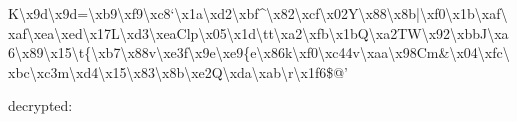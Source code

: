 \documentclass[11pt]{article}
\begin{document}
K\textbackslash{}x9d\textbackslash{}x9d=\textbackslash{}xb9\textbackslash{}xf9\textbackslash{}xc8`\textbackslash{}x1a\textbackslash{}xd2\textbackslash{}xbf\^{}\textbackslash{}x82\textbackslash{}xcf\textbackslash{}x02Y\textbackslash{}x88\textbackslash{}x8b|\textbackslash{}xf0\textbackslash{}x1b\textbackslash{}xaf\textbackslash{}xaf\textbackslash{}xea\textbackslash{}xed\textbackslash{}x17L\textbackslash{}xd3\textbackslash{}xeaClp\textbackslash{}x05\textbackslash{}x1d\textbackslash{}tt\textbackslash{}xa2\textbackslash{}xfb\textbackslash{}x1bQ\textbackslash{}xa2TW\textbackslash{}x92\textbackslash{}xbbJ\textbackslash{}xa6\textbackslash{}x89\textbackslash{}x15\textbackslash{}t\{\textbackslash{}xb7\textbackslash{}x88v\textbackslash{}xe3f\textbackslash{}x9e\textbackslash{}xe9\{e\textbackslash{}x86k\textbackslash{}xf0\textbackslash{}xc44v\textbackslash{}xaa\textbackslash{}x98Cm\&\textbackslash{}x04\textbackslash{}xfc\textbackslash{}xbc\textbackslash{}xc3m\textbackslash{}xd4\textbackslash{}x15\textbackslash{}x83\textbackslash{}x8b\textbackslash{}xe2Q\textbackslash{}xda\textbackslash{}xab\textbackslash{}r\textbackslash{}x1f6\$@'

    decrypted:
\end{document}

